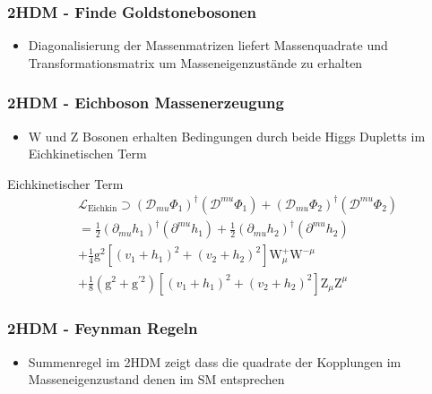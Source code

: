 \documentclass{beamer}
\begin{document}
\begin{frame}[t]
\frametitle{2HDM - Finde Goldstonebosonen}
\begin{itemize}
\item Diagonalisierung der Massenmatrizen liefert Massenquadrate und Transformationsmatrix um Masseneigenzustände zu erhalten
\end{itemize}
\end{frame}
\begin{frame}
\frametitle{2HDM - Eichboson Massenerzeugung}
\begin{itemize}
\item W und Z Bosonen erhalten Bedingungen durch beide Higgs Dupletts im Eichkinetischen Term 
\end{itemize}
\begin{block}{Eichkinetischer Term}
\begin{align*}
&\mathscr{L}_{\text{Eichkin}} \supset (\mathscr{D}_{mu}\Phi_{1})^{\dagger}(\mathscr{D}^{mu}\Phi_{1})+(\mathscr{D}_{mu}\Phi_{2})^{\dagger}(\mathscr{D}^{mu}\Phi_{2}) \\
&= \frac{1}{2} (\partial_{mu}h_{1})^{\dagger}(\partial^{mu}h_{1})+\frac{1}{2}(\partial_{mu}h_{2})^{\dagger}(\partial^{mu}h_{2}) \\
&+\frac{1}{4} \text{g}^2 [(v_{1}+h_{1})^{2}+(v_{2}+h_{2})^{2}]\text{W}_{\mu}^{+}\text{W}^{-\mu}\\
&+\frac{1}{8} (\text{g}^{2}+\text{g}^{\prime2}) [(v_{1}+h_{1})^{2}+(v_{2}+h_{2})^{2}]\text{Z}_{\mu}\text{Z}^{\mu}
\end{align*}
\end{block}
\end{frame}



\begin{frame}[t]
\frametitle{2HDM - Feynman Regeln}
\begin{itemize}
\item Summenregel im 2HDM zeigt dass die quadrate der Kopplungen im Masseneigenzustand denen im SM entsprechen
\end{itemize}
\end{frame}
\end{document}
